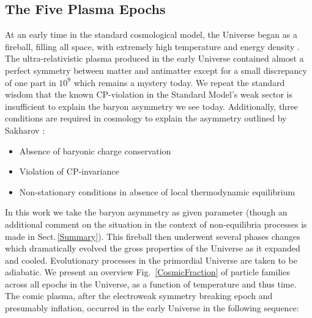\documentclass[universe,article,submit,moreauthors,pdftex,a4paper]{Definitions/mdpi}
\newcommand*{\rf}[1]{Fig.~{\ref{#1}}}
\newcommand*{\rsec}[1]{Sect.\,{\ref{#1}}}
\begin{document}
\subsection{The Five Plasma Epochs}\label{sec:Timeline}
\noindent At an early time in the standard cosmological model, the Universe began as a fireball, filling all space, with extremely high temperature and energy density \cite{Rafelski:2015cxa}. The ultra-relativistic plasma produced in the early Universe contained almost a perfect symmetry between matter and antimatter except for a small discrepancy of one part in $10^{9}$ which remains a mystery today. We repeat the standard wisdom that the known CP-violation in the Standard Model's weak sector is insufficient to explain the baryon asymmetry we see today. Additionally, three conditions are required in cosmology to explain the asymmetry outlined by Sakharov \cite{Sakharov:1967dj,Sakharov:1988vdp}:
\begin{itemize}
    \item Absence of baryonic charge conservation 
    \item Violation of CP-invariance
    \item Non-stationary conditions in absence of local thermodynamic equilibrium
\end{itemize}
In this work we take the baryon asymmetry as given parameter (though an additional comment on the situation in the context of non-equilibria processes is made in \rsec{Summary}). This fireball then underwent several phases changes which dramatically evolved the gross properties of the Universe as it expanded and cooled. Evolutionary processes in the primordial Universe are taken to be adiabatic. We present an overview \rf{CosmicFraction} of particle families across all epochs in the Universe, as a function of temperature and thus time. The comic plasma, after the electroweak symmetry breaking epoch and presumably inflation, occurred in the early Universe in the following sequence:
\end{document}
